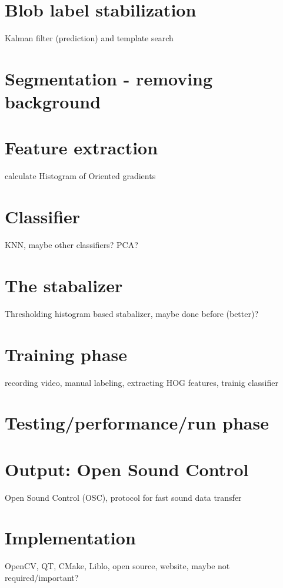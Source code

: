 \section{Blob label stabilization}
Kalman filter (prediction) and template search

\section{Segmentation - removing background}

\section{Feature extraction}
calculate Histogram of Oriented gradients\cite{watanabe2009}

\section{Classifier}
KNN, maybe other classifiers? PCA?

\section{The stabalizer}
Thresholding histogram based stabalizer, maybe done before (better)?

\section{Training phase}
recording video, manual labeling, extracting HOG features, trainig classifier

\section{Testing/performance/run phase}


\section{Output: Open Sound Control}
Open Sound Control (OSC), protocol for fast sound data transfer

\section{Implementation}
OpenCV, QT, CMake, Liblo, open source, website, maybe not required/important?

